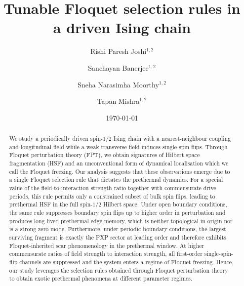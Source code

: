 \documentclass[aps,prb,reprint,twocolumn,amsmath,amssymb,citeautoscript]{revtex4-2}
\begin{document}
\title{Tunable Floquet selection rules in a driven Ising chain}

\author{Rishi Paresh Joshi$^{1,2}$}
\author{Sanchayan Banerjee$^{1,2}$}
\author{Sneha Narasimha Moorthy$^{1,2}$}
\author{Tapan Mishra$^{1,2}$}


\date{\today}

\begin{abstract}
We study a periodically driven spin-$1/2$ Ising chain with a nearest-neighbour coupling and longitudinal field while a weak transverse field induces single-spin flips. Through Floquet perturbation theory (FPT), we obtain signatures of Hilbert space fragmentation (HSF) and an unconventional form of dynamical localisation which we call the Floquet freezing. Our analysis suggests that these observations emerge due to a single Floquet selection rule that dictates the prethermal dynamics. For a special value of the field-to-interaction strength ratio together with commensurate drive periods, this rule permits only a constrained subset of bulk spin flips, leading to prethermal HSF in the full spin-$1/2$ Hilbert space. Under open boundary conditions, the same rule suppresses boundary spin flips up to higher order in perturbation and produces long-lived prethermal edge memory, which is neither topological in origin nor is a strong zero mode. Furthermore, under periodic boundary conditions, the largest surviving fragment is exactly the PXP sector at leading order and therefore exhibits Floquet-inherited scar phenomenology in the prethermal window. At higher commensurate ratios of field strength to interaction strength, all first-order single-spin-flip channels are suppressed and the system enters a regime of Floquet freezing. Hence, our study leverages the selection rules obtained through Floquet perturbation theory to obtain exotic prethermal phenomena at different parameter regimes.



\end{abstract}

\maketitle
\end{document}
